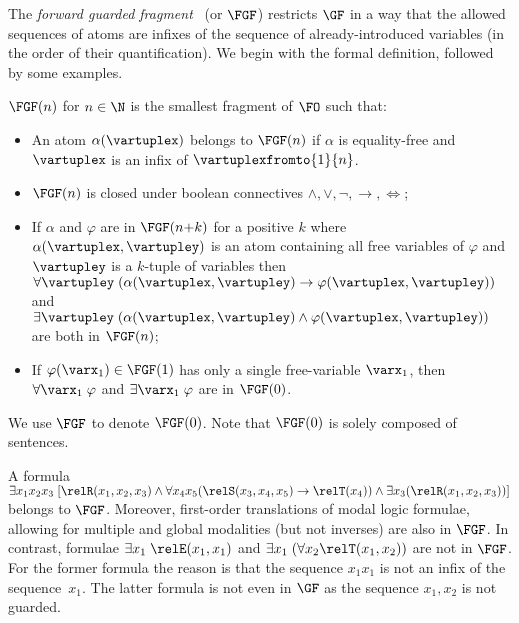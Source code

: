 The \emph{forward guarded fragment}~\cite[Sec. 3.1]{Bednarczyk21} (or $\FGF$) restricts $\GF$ in a way that the allowed sequences of atoms are infixes of the sequence of already-introduced variables (in the order of their quantification).
We begin with the formal definition, followed by some examples.
\begin{definition}
  $\FGF(n)$ for $n \in \N$ is the smallest fragment of $\FO$ such that:
  \begin{itemize}\itemsep0em
      \item An atom $\alpha(\vartuplex)$ belongs to $\FGF(n)$ if $\alpha$ is equality-free and $\vartuplex$ is an infix of $\vartuplexfromto{1}{n}$.
      \item $\FGF(n)$ is closed under boolean connectives $\land, \lor, \neg, \to, \iff$;
      \item If $\alpha$ and $\varphi$ are in $\FGF(n{+}k)$ for a positive $k$ where $\alpha(\vartuplex, \vartupley)$ is an atom containing all free variables of $\varphi$ and $\vartupley$ is a $k$-tuple of variables then $\forall{\vartupley} \; (\alpha(\vartuplex, \vartupley) \to \varphi(\vartuplex, \vartupley))$ and $\exists{\vartupley} \; (\alpha(\vartuplex, \vartupley) \land \varphi(\vartuplex, \vartupley))$ are both in $\FGF(n)$;
      \item If $\varphi(\varx_1) \in \FGF(1)$ has only a single free-variable $\varx_1$, then $\forall{\varx_1}\; \varphi$ and $\exists{\varx_1}\; \varphi$ are in $\FGF(0)$.
  \end{itemize}
\end{definition}
We use $\FGF$ to denote $\FGF(0)$. Note that $\FGF(0)$ is solely composed of sentences.

\begin{example}
A formula $\exists{x_1x_{2}x_{3}}\; [\relR(x_{1}, x_{2}, x_{3}) \land \forall{x_{4}x_{5}}(\relS(x_{3}, x_{4}, x_{5}) \to \relT(x_{4})) \land \exists{x_{3}}(\relR(x_{1}, x_{2}, x_{3}))]$ belongs to $\FGF$.
Moreover, first-order translations of modal logic formulae, allowing for multiple and global modalities (but not inverses) are also in $\FGF$.
In contrast, formulae $\exists{x_{1}}\; \relE(x_{1}, x_{1})$ and $\exists{x_{1}}\; (\forall{x_{2}} \relT(x_{1}, x_{2}))$ are not in $\FGF$.
For the former formula the reason is that the sequence $x_1x_1$ is not an infix of the sequence~$x_1$.
The latter formula is not even in $\GF$ as the sequence $x_{1}, x_{2}$ is not guarded.
\end{example}
